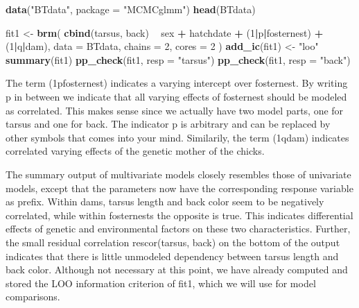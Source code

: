 \documentclass[]{book}
\newenvironment{Shaded}{\begin{snugshade}}{\end{snugshade}}
\newcommand{\DataTypeTok}[1]{\textcolor[rgb]{0.13,0.29,0.53}{#1}}
\newcommand{\DecValTok}[1]{\textcolor[rgb]{0.00,0.00,0.81}{#1}}
\newcommand{\KeywordTok}[1]{\textcolor[rgb]{0.13,0.29,0.53}{\textbf{#1}}}
\newcommand{\NormalTok}[1]{#1}
\newcommand{\OperatorTok}[1]{\textcolor[rgb]{0.81,0.36,0.00}{\textbf{#1}}}
\newcommand{\StringTok}[1]{\textcolor[rgb]{0.31,0.60,0.02}{#1}}
\begin{document}
\begin{Shaded}
\begin{Highlighting}[]
\KeywordTok{data}\NormalTok{(}\StringTok{"BTdata"}\NormalTok{, }\DataTypeTok{package =} \StringTok{"MCMCglmm"}\NormalTok{)}
\KeywordTok{head}\NormalTok{(BTdata)}
\end{Highlighting}
\end{Shaded}

\begin{Shaded}
\begin{Highlighting}[]
\NormalTok{fit1 <-}\StringTok{ }\KeywordTok{brm}\NormalTok{(}
  \KeywordTok{cbind}\NormalTok{(tarsus, back) }\OperatorTok{~}\StringTok{ }\NormalTok{sex }\OperatorTok{+}\StringTok{ }\NormalTok{hatchdate }\OperatorTok{+}\StringTok{ }\NormalTok{(}\DecValTok{1}\OperatorTok{|}\NormalTok{p}\OperatorTok{|}\NormalTok{fosternest) }\OperatorTok{+}\StringTok{ }\NormalTok{(}\DecValTok{1}\OperatorTok{|}\NormalTok{q}\OperatorTok{|}\NormalTok{dam),}
  \DataTypeTok{data =}\NormalTok{ BTdata, }\DataTypeTok{chains =} \DecValTok{2}\NormalTok{, }\DataTypeTok{cores =} \DecValTok{2}
\NormalTok{)}
\KeywordTok{add_ic}\NormalTok{(fit1) <-}\StringTok{ "loo"}
\KeywordTok{summary}\NormalTok{(fit1)}
\KeywordTok{pp_check}\NormalTok{(fit1, }\DataTypeTok{resp =} \StringTok{"tarsus"}\NormalTok{)}
\KeywordTok{pp_check}\NormalTok{(fit1, }\DataTypeTok{resp =} \StringTok{"back"}\NormalTok{)}
\end{Highlighting}
\end{Shaded}

The term (1\textbar{}p\textbar{}fosternest) indicates a varying intercept over fosternest. By writing \textbar{}p\textbar{} in between we indicate that all varying effects of fosternest should be modeled as correlated. This makes sense since we actually have two model parts, one for tarsus and one for back. The indicator p is arbitrary and can be replaced by other symbols that comes into your mind.
Similarily, the term (1\textbar{}q\textbar{}dam) indicates correlated varying effects of the genetic mother of the chicks.

The summary output of multivariate models closely resembles those of univariate models, except that the parameters now have the corresponding response variable as prefix. Within dams, tarsus length and back color seem to be negatively correlated, while within fosternests the opposite is true. This indicates differential effects of genetic and environmental factors on these two characteristics. Further, the small residual correlation rescor(tarsus, back) on the bottom of the output indicates that there is little unmodeled dependency between tarsus length and back color. Although not necessary at this point, we have already computed and stored the LOO information criterion of fit1, which we will use for model comparisons.
\end{document}

